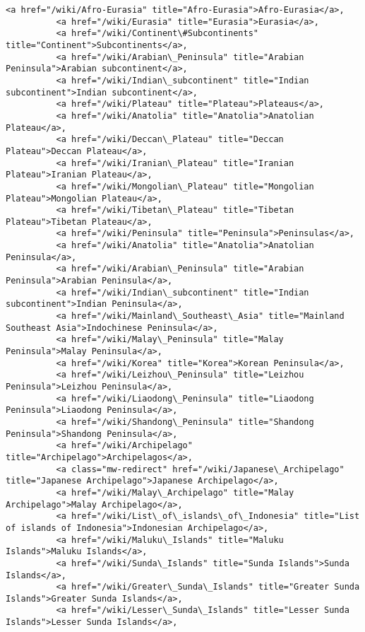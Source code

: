 \documentclass[11pt]{article}
\begin{document}
\begin{Verbatim}[commandchars=\\\{\}]
          <a href="/wiki/Afro-Eurasia" title="Afro-Eurasia">Afro-Eurasia</a>,
          <a href="/wiki/Eurasia" title="Eurasia">Eurasia</a>,
          <a href="/wiki/Continent\#Subcontinents" title="Continent">Subcontinents</a>,
          <a href="/wiki/Arabian\_Peninsula" title="Arabian Peninsula">Arabian subcontinent</a>,
          <a href="/wiki/Indian\_subcontinent" title="Indian subcontinent">Indian subcontinent</a>,
          <a href="/wiki/Plateau" title="Plateau">Plateaus</a>,
          <a href="/wiki/Anatolia" title="Anatolia">Anatolian Plateau</a>,
          <a href="/wiki/Deccan\_Plateau" title="Deccan Plateau">Deccan Plateau</a>,
          <a href="/wiki/Iranian\_Plateau" title="Iranian Plateau">Iranian Plateau</a>,
          <a href="/wiki/Mongolian\_Plateau" title="Mongolian Plateau">Mongolian Plateau</a>,
          <a href="/wiki/Tibetan\_Plateau" title="Tibetan Plateau">Tibetan Plateau</a>,
          <a href="/wiki/Peninsula" title="Peninsula">Peninsulas</a>,
          <a href="/wiki/Anatolia" title="Anatolia">Anatolian Peninsula</a>,
          <a href="/wiki/Arabian\_Peninsula" title="Arabian Peninsula">Arabian Peninsula</a>,
          <a href="/wiki/Indian\_subcontinent" title="Indian subcontinent">Indian Peninsula</a>,
          <a href="/wiki/Mainland\_Southeast\_Asia" title="Mainland Southeast Asia">Indochinese Peninsula</a>,
          <a href="/wiki/Malay\_Peninsula" title="Malay Peninsula">Malay Peninsula</a>,
          <a href="/wiki/Korea" title="Korea">Korean Peninsula</a>,
          <a href="/wiki/Leizhou\_Peninsula" title="Leizhou Peninsula">Leizhou Peninsula</a>,
          <a href="/wiki/Liaodong\_Peninsula" title="Liaodong Peninsula">Liaodong Peninsula</a>,
          <a href="/wiki/Shandong\_Peninsula" title="Shandong Peninsula">Shandong Peninsula</a>,
          <a href="/wiki/Archipelago" title="Archipelago">Archipelagos</a>,
          <a class="mw-redirect" href="/wiki/Japanese\_Archipelago" title="Japanese Archipelago">Japanese Archipelago</a>,
          <a href="/wiki/Malay\_Archipelago" title="Malay Archipelago">Malay Archipelago</a>,
          <a href="/wiki/List\_of\_islands\_of\_Indonesia" title="List of islands of Indonesia">Indonesian Archipelago</a>,
          <a href="/wiki/Maluku\_Islands" title="Maluku Islands">Maluku Islands</a>,
          <a href="/wiki/Sunda\_Islands" title="Sunda Islands">Sunda Islands</a>,
          <a href="/wiki/Greater\_Sunda\_Islands" title="Greater Sunda Islands">Greater Sunda Islands</a>,
          <a href="/wiki/Lesser\_Sunda\_Islands" title="Lesser Sunda Islands">Lesser Sunda Islands</a>,

\end{Verbatim}
\end{document}
